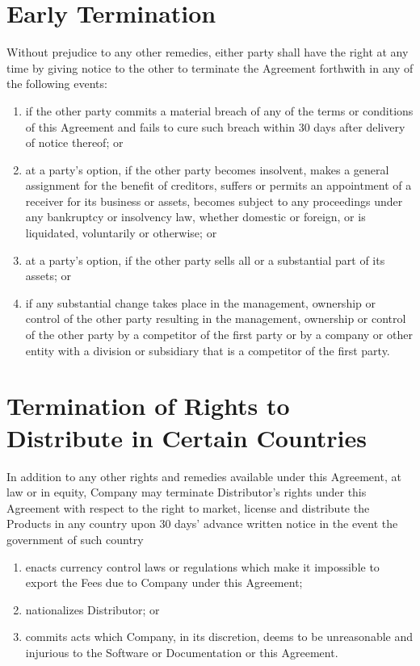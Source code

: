 \documentclass[letterpaper,10pt,english]{sphinxmanual}
\begin{document}
\section{Early Termination}
\label{\detokenize{terminiation:early-termination}}
Without prejudice to any other remedies, either party shall have the right at any time by giving notice to the other to terminate the Agreement forthwith in any of the following events:
\begin{enumerate}
\item {} 
if the other party commits a material breach of any of the terms or conditions of this Agreement and fails to cure such breach within 30 days after delivery of notice thereof; or

\item {} 
at a party’s option, if the other party becomes insolvent, makes a general assignment for the benefit of creditors, suffers or permits an appointment of a receiver for its business or assets, becomes subject to any proceedings under any bankruptcy or insolvency law, whether domestic or foreign, or is liquidated, voluntarily or otherwise; or

\item {} 
at a party’s option, if the other party sells all or a substantial part of its assets; or

\item {} 
if any substantial change takes place in the management, ownership or control of the other party resulting in the management, ownership or control of the other party by a competitor of the first party or by a company or other entity with a division or subsidiary that is a competitor of the first party.

\end{enumerate}


\section{Termination of Rights to Distribute in Certain Countries}
\label{\detokenize{terminiation:termination-of-rights-to-distribute-in-certain-countries}}
In addition to any other rights and remedies available under this Agreement, at law or in equity, Company may terminate Distributor’s rights under this Agreement with respect to the right to market, license and distribute the Products in any country upon 30 days’ advance written notice in the event the government of such country
\begin{enumerate}
\item {} 
enacts currency control laws or regulations which make it impossible to export the Fees due to Company under this Agreement;

\item {} 
nationalizes Distributor; or

\item {} 
commits acts which Company, in its discretion, deems to be unreasonable and injurious to the Software or Documentation or this Agreement.

\end{enumerate}
\end{document}
